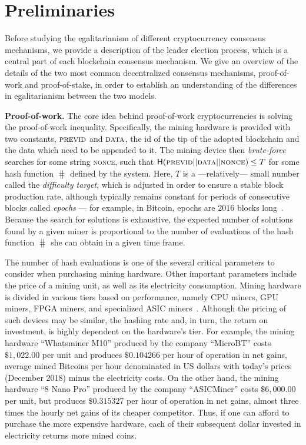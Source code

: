 \section{Preliminaries}\label{sec:preliminaries}

Before studying the egalitarianism of different cryptocurrency consensus mechanisms, we
provide a description of the leader election process, which is a central part
of each blockchain consensus mechanism. We give an
overview of the details of the two most common decentralized consensus mechanisms,
proof-of-work and proof-of-stake, in order to establish an understanding of the
differences in egalitarianism between the two models.

\noindent\textbf{Proof-of-work.}
The core idea behind proof-of-work cryptocurrencies is solving the
proof-of-work inequality.  Specifically, the mining hardware is provided with
two constants, $\textsc{previd}$ and $\textsc{data}$, \ie the id of the
tip of the adopted blockchain and the data which need to be appended to it.  The mining
device then \emph{brute-force} searches for some string \textsc{nonce}, such
that $\mathsf{H}(\textsc{previd} || \textsc{data} || \textsc{nonce}) \leq T$ for
some hash function $\hash$ defined by the system. Here, $T$ is a
---relatively--- small number called the \emph{difficulty target}, which is
adjusted in order to ensure a stable block production rate, although typically
remains constant for periods of consecutive blocks called \emph{epochs} --- for
example, in Bitcoin, epochs are $2016$ blocks long~\cite{SP:BMCNKF15}. Because the search for
solutions is exhaustive, the expected number of solutions found by a given
miner is proportional to the number of evaluations of the
hash function $\hash$ she can obtain in a given time frame.

The number of hash evaluations is one of the several critical parameters to
consider when purchasing mining hardware. Other important parameters include
the price of a mining unit, as well as its electricity consumption.  Mining
hardware is divided in various tiers based on performance, namely CPU miners,
GPU miners, FPGA miners, and specialized ASIC miners~\cite{taylor2013bitcoin}.  Although the pricing of
such devices may be similar, the hashing rate and, in turn, the return on
investment, is highly dependent on the hardware's tier.  For example,
the mining hardware ``Whatsminer M10'' produced by the company ``MicroBT''
costs $\$1{,}022.00$ per unit and produces $\$0.104266$ per hour of operation in
net gains, \ie average mined Bitcoins per hour denominated in US dollars with today's
prices (December 2018) minus the electricity costs. On the other hand, the
mining hardware ``8 Nano Pro'' produced by the company ``ASICMiner'' costs
$\$6{,}000.00$ per unit, but produces $\$0.315327$ per hour of operation in net
gains, \ie almost three times the hourly net gains of its cheaper competitor.
Thus, if one can afford to purchase the more expensive hardware, each of their
subsequent dollar invested in electricity returns more mined coins.

